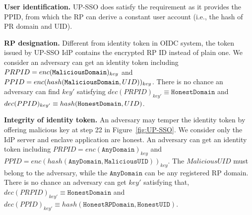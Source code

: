 \vspace{1mm}\noindent\textbf{User identification.}
UP-SSO does satisfy the requirement as it provides the PPID, from which the RP can derive a constant user account (i.e., the hash of PR domain and UID).%


\vspace{1mm}\noindent\textbf{RP designation.} 
Different from identity token in OIDC system, the token issued by UP-SSO IdP contains the encrypted RP ID instead of plain one. 
We consider an adversary can get an identity token including $\\PRPID=enc(\mathtt{Malicious Domain})_{key}$ and $\\PPID=enc(hash(\mathtt{Malicious Domain}, UID))_{key}$.
\newline There is no chance an adversary can find  $key'$ satisfying \newline $dec(PRPID)_{key'} \equiv \mathtt{Honest Domain}$ and  $\\ dec(PPID)_{key'}  \equiv  hash(\mathtt{Honest Domain}, UID)$.



\vspace{1mm}\noindent\textbf{Integrity of identity token.}
An adversary may temper the identity token by offering malicious key at step 22 in Figure~\ref{fig:UP-SSO}. 
We consider  only the IdP server and enclave application are honest. An adversary can get an identity token including 
\newline $PRPID=enc(\mathtt{Any Domain})_{key}$ and 
\newline $PPID=enc(hash(\mathtt{Any Domain}, \mathtt{Malicious UID}))_{key}$. 
\newline The $Malicious UID$ must belong to the adversary, while the $\mathtt{Any Domain}$ can be any registered RP domain.
There is no chance an adversary can get $key'$  satisfying that, 
\newline $dec(PRPID)_{key'} \equiv \mathtt{Honest Domain}$ and  
\newline $dec(PPID)_{key'} \equiv  hash(\mathtt{Honest RPDomain}, \mathtt{Honest UID})$.

